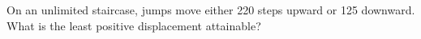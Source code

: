 On an unlimited staircase, jumps move either 220 steps upward or 125 downward. What is the least positive displacement attainable?
